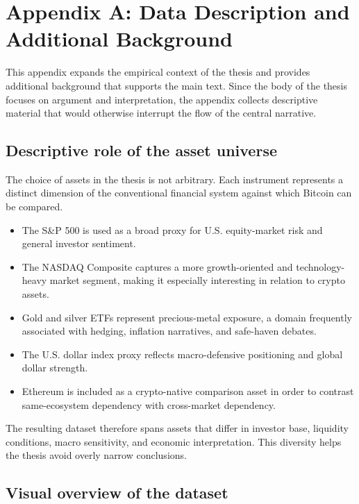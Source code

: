 ﻿\section{Appendix A: Data Description and Additional Background}

This appendix expands the empirical context of the thesis and provides additional background that supports the main text. Since the body of the thesis focuses on argument and interpretation, the appendix collects descriptive material that would otherwise interrupt the flow of the central narrative.

\subsection{Descriptive role of the asset universe}

The choice of assets in the thesis is not arbitrary. Each instrument represents a distinct dimension of the conventional financial system against which Bitcoin can be compared.

\begin{itemize}
    \item The S\&P 500 is used as a broad proxy for U.S. equity-market risk and general investor sentiment.
    \item The NASDAQ Composite captures a more growth-oriented and technology-heavy market segment, making it especially interesting in relation to crypto assets.
    \item Gold and silver ETFs represent precious-metal exposure, a domain frequently associated with hedging, inflation narratives, and safe-haven debates.
    \item The U.S. dollar index proxy reflects macro-defensive positioning and global dollar strength.
    \item Ethereum is included as a crypto-native comparison asset in order to contrast same-ecosystem dependency with cross-market dependency.
\end{itemize}

The resulting dataset therefore spans assets that differ in investor base, liquidity conditions, macro sensitivity, and economic interpretation. This diversity helps the thesis avoid overly narrow conclusions.

\subsection{Visual overview of the dataset}

